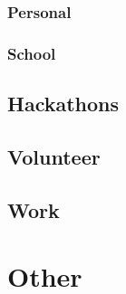\documentclass[10pt,a4paper,twocolumn]{article}
\begin{document}
\subsubsection*{Personal}
\subsubsection*{School}
\subsection*{Hackathons}
\subsection*{Volunteer}
\subsection*{Work}

\section*{Other}
\end{document}
